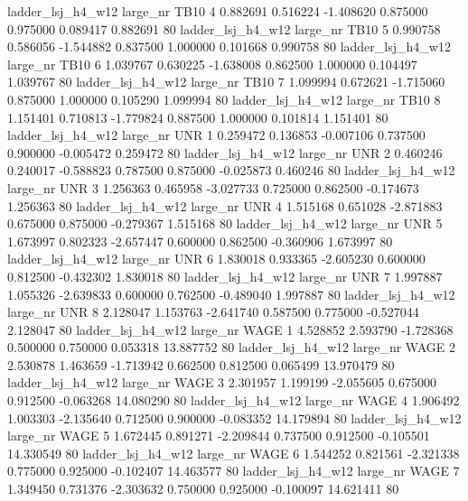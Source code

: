   ladder_lsj_h4_w12   large_nr     TB10                 4  0.882691  0.516224  -1.408620 0.875000 0.975000  0.089417    0.882691 80
  ladder_lsj_h4_w12   large_nr     TB10                 5  0.990758  0.586056  -1.544882 0.837500 1.000000  0.101668    0.990758 80
  ladder_lsj_h4_w12   large_nr     TB10                 6  1.039767  0.630225  -1.638008 0.862500 1.000000  0.104497    1.039767 80
  ladder_lsj_h4_w12   large_nr     TB10                 7  1.099994  0.672621  -1.715060 0.875000 1.000000  0.105290    1.099994 80
  ladder_lsj_h4_w12   large_nr     TB10                 8  1.151401  0.710813  -1.779824 0.887500 1.000000  0.101814    1.151401 80
  ladder_lsj_h4_w12   large_nr      UNR                 1  0.259472  0.136853  -0.007106 0.737500 0.900000 -0.005472    0.259472 80
  ladder_lsj_h4_w12   large_nr      UNR                 2  0.460246  0.240017  -0.588823 0.787500 0.875000 -0.025873    0.460246 80
  ladder_lsj_h4_w12   large_nr      UNR                 3  1.256363  0.465958  -3.027733 0.725000 0.862500 -0.174673    1.256363 80
  ladder_lsj_h4_w12   large_nr      UNR                 4  1.515168  0.651028  -2.871883 0.675000 0.875000 -0.279367    1.515168 80
  ladder_lsj_h4_w12   large_nr      UNR                 5  1.673997  0.802323  -2.657447 0.600000 0.862500 -0.360906    1.673997 80
  ladder_lsj_h4_w12   large_nr      UNR                 6  1.830018  0.933365  -2.605230 0.600000 0.812500 -0.432302    1.830018 80
  ladder_lsj_h4_w12   large_nr      UNR                 7  1.997887  1.055326  -2.639833 0.600000 0.762500 -0.489040    1.997887 80
  ladder_lsj_h4_w12   large_nr      UNR                 8  2.128047  1.153763  -2.641740 0.587500 0.775000 -0.527044    2.128047 80
  ladder_lsj_h4_w12   large_nr     WAGE                 1  4.528852  2.593790  -1.728368 0.500000 0.750000  0.053318   13.887752 80
  ladder_lsj_h4_w12   large_nr     WAGE                 2  2.530878  1.463659  -1.713942 0.662500 0.812500  0.065499   13.970479 80
  ladder_lsj_h4_w12   large_nr     WAGE                 3  2.301957  1.199199  -2.055605 0.675000 0.912500 -0.063268   14.080290 80
  ladder_lsj_h4_w12   large_nr     WAGE                 4  1.906492  1.003303  -2.135640 0.712500 0.900000 -0.083352   14.179894 80
  ladder_lsj_h4_w12   large_nr     WAGE                 5  1.672445  0.891271  -2.209844 0.737500 0.912500 -0.105501   14.330549 80
  ladder_lsj_h4_w12   large_nr     WAGE                 6  1.544252  0.821561  -2.321338 0.775000 0.925000 -0.102407   14.463577 80
  ladder_lsj_h4_w12   large_nr     WAGE                 7  1.349450  0.731376  -2.303632 0.750000 0.925000 -0.100097   14.621411 80
